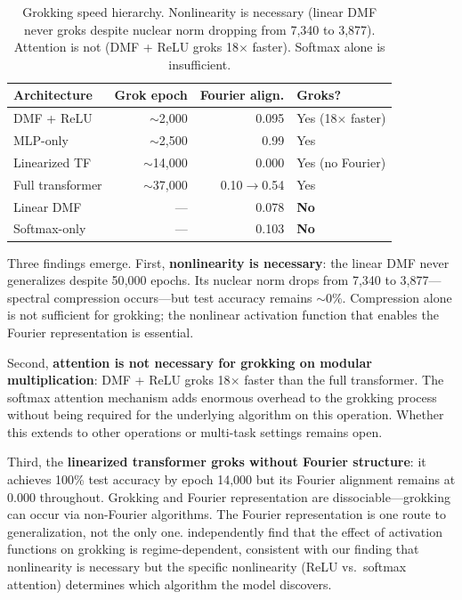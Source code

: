 \documentclass{article}
\begin{document}
\begin{table}[t]
\centering
\small
\begin{tabular}{lrrl}
\toprule
Architecture & Grok epoch & Fourier align. & Groks? \\
\midrule
DMF + ReLU     & $\sim$2{,}000   & 0.095 & Yes (18$\times$ faster) \\
MLP-only       & $\sim$2{,}500   & 0.99  & Yes \\
Linearized TF  & $\sim$14{,}000  & 0.000 & Yes (no Fourier) \\
Full transformer & $\sim$37{,}000 & 0.10$\to$0.54 & Yes \\
Linear DMF     & ---          & 0.078 & \textbf{No} \\
Softmax-only   & ---          & 0.103 & \textbf{No} \\
\bottomrule
\end{tabular}
\caption{Grokking speed hierarchy. Nonlinearity is necessary (linear DMF never
groks despite nuclear norm dropping from 7{,}340 to 3{,}877). Attention is not
(DMF + ReLU groks 18$\times$ faster). Softmax alone is insufficient.}
\label{tab:grokking_speed}
\end{table}

Three findings emerge. First, \textbf{nonlinearity is necessary}: the linear
DMF never generalizes despite 50{,}000 epochs. Its nuclear norm drops from
7{,}340 to 3{,}877---spectral compression occurs---but test accuracy remains
$\sim$0\%. Compression alone is not sufficient for grokking; the nonlinear
activation function that enables the Fourier representation is essential.

Second, \textbf{attention is not necessary for grokking on modular
multiplication}: DMF + ReLU groks 18$\times$ faster than the full
transformer. The softmax attention mechanism adds enormous overhead to the
grokking process without being required for the underlying algorithm on this
operation. Whether this extends to other operations or multi-task settings
remains open.

Third, the \textbf{linearized transformer groks without Fourier structure}:
it achieves 100\% test accuracy by epoch 14{,}000 but its Fourier alignment
remains at 0.000 throughout. Grokking and Fourier representation are
dissociable---grokking can occur via non-Fourier algorithms. The Fourier
representation is one route to generalization, not the only one.
\citet{xu2026systematic} independently find that the effect of activation
functions on grokking is regime-dependent, consistent with our finding that
nonlinearity is necessary but the specific nonlinearity (ReLU vs.\ softmax
attention) determines which algorithm the model discovers.
\end{document}
